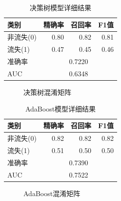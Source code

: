\documentclass{article}
\begin{document}
\begin{table}[t]
\caption{决策树模型详细结果}
\label{tab:decision-tree}
\begin{center}
\scriptsize
\begin{tabular}{@{}lrrr@{}}
\toprule
\textbf{类别} & \textbf{精确率} & \textbf{召回率} & \textbf{F1值} \\
\midrule
非流失(0) & 0.80 & 0.82 & 0.81 \\
流失(1) & 0.47 & 0.45 & 0.46 \\
\midrule
准确率 & \multicolumn{3}{c}{0.7220} \\
AUC & \multicolumn{3}{c}{0.6348} \\
\bottomrule
\end{tabular}
\end{center}
\end{table}

\begin{figure}[t]
\centering
\small
\setlength{\fboxsep}{3pt}
\caption{决策树混淆矩阵}
\label{fig:confusion-dt}
\end{figure}

\begin{table}[t]
\caption{AdaBoost模型详细结果}
\label{tab:adaboost}
\begin{center}
\scriptsize
\begin{tabular}{@{}lrrr@{}}
\toprule
\textbf{类别} & \textbf{精确率} & \textbf{召回率} & \textbf{F1值} \\
\midrule
非流失(0) & 0.82 & 0.82 & 0.82 \\
流失(1) & 0.51 & 0.50 & 0.50 \\
\midrule
准确率 & \multicolumn{3}{c}{0.7390} \\
AUC & \multicolumn{3}{c}{0.7522} \\
\bottomrule
\end{tabular}
\end{center}
\end{table}

\begin{figure}[t]
\centering
\small
\setlength{\fboxsep}{3pt}
\caption{AdaBoost混淆矩阵}
\label{fig:confusion-boost}
\end{figure}
\end{document}
